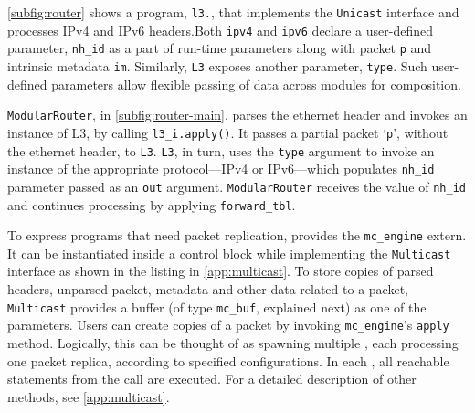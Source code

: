 \documentclass[letterpaper,twocolumn,10pt]{article}
\begin{document}

\cref{subfig:router} shows a program, \texttt{l3.\ulang}, that
implements the \texttt{Unicast} interface and processes IPv4 and IPv6
headers.\footnotemark[\value{footnote}] Both \texttt{ipv4} and
\texttt{ipv6} declare a user-defined parameter, \texttt{nh\_id} as a
part of run-time parameters along with packet \texttt{p} and intrinsic
metadata \texttt{im}. Similarly, \texttt{L3} exposes another
parameter, \texttt{type}.  Such user-defined parameters allow flexible
passing of data across modules for composition.

\texttt{ModularRouter}, in \cref{subfig:router-main}, parses the
ethernet header and invokes an instance of L3, by calling
\texttt{l3\_i.apply()}. It passes a partial packet `\texttt{p}',
without the ethernet header, to \texttt{L3}.  \texttt{L3}, in turn,
uses the \texttt{type} argument to invoke an instance of the
appropriate protocol---IPv4 or IPv6---which populates \texttt{nh\_id}
parameter passed as an \texttt{out} argument. \texttt{ModularRouter}
receives the value of \texttt{nh\_id} and continues processing by
applying \texttt{forward\_tbl}.







To express programs that need packet replication, \uarch provides the
\texttt{mc\_engine} extern. It can be instantiated inside a control
block while implementing the \texttt{Multicast} interface as shown in
the listing in \cref{app:multicast}.  To store copies of parsed
headers, unparsed packet, metadata and other data related to a packet,
\texttt{Multicast} provides a buffer (of type \texttt{mc\_buf},
explained next) as one of the parameters.  Users can create copies of
a packet by invoking \texttt{mc\_engine}'s \texttt{apply} method.
Logically, this can be thought of as spawning multiple \upipelines,
each processing one packet replica, according to specified
configurations. In each \upipeline, all reachable statements from the
call are executed.
For a detailed description of other methods, see \cref{app:multicast}.

\end{document}
